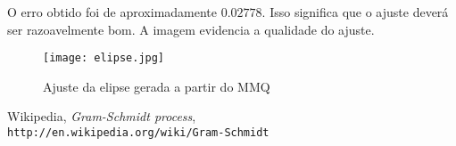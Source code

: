 \documentclass[12pt,a4paper]{article}
\begin{document}
O erro obtido foi de aproximadamente $0.02778$. Isso significa que o ajuste 
deverá ser razoavelmente bom. A imagem evidencia a qualidade do ajuste.

\begin{figure}[ht]\centering
    \texttt{[image: elipse.jpg]}
    \caption{Ajuste da elipse gerada a partir do MMQ}
\end{figure}

\begin{thebibliography}{9999}
    Wikipedia, \textsl{Gram-Schmidt process},\\
        \mbox{}\hfill\texttt{http://en.wikipedia.org/wiki/Gram-Schmidt}
\end{thebibliography}
\end{document}
